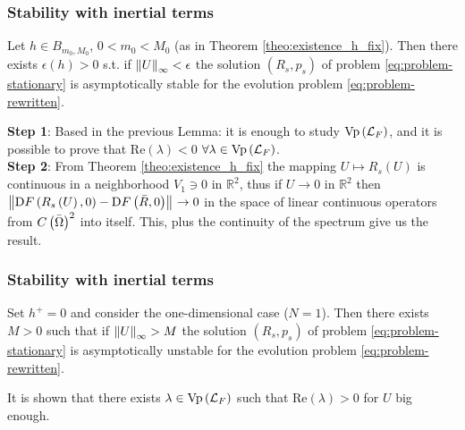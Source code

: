 \documentclass[10pt,aspectratio=169]{beamer}
\begin{document}

\begin{frame}
\frametitle{Stability with inertial terms}
\begin{theorem}\label{theo:stabilite-avec-inertie-h-fixe} Let $h\in B_{m_0,M_0}$, $0<m_0<M_0$ (as in Theorem \ref{theo:existence_h_fix}). Then there exists $\epsilon\left(h\right)>0$ s.t. if $\left\lVert U\right\rVert_{\infty}<\epsilon$ the solution $\left(R_s,p_s\right)$ of problem \eqref{eq:problem-stationary} is asymptotically stable for the evolution problem \eqref{eq:problem-rewritten}.
\end{theorem}\bigskip
\textbf{Step 1}: Based in the previous Lemma: it is enough to study $\textnormal{Vp}\left(\mathcal{L}_F\right)$, and it is possible to prove that  $\mbox{Re}\left(\lambda\right)<0$ $\forall \lambda \in \textnormal{Vp}\left(\mathcal{L}_F\right)$.\\ \bigskip
\textbf{Step 2}: From Theorem \ref{theo:existence_h_fix} the mapping $U\mapsto R_s\left(U\right)$ is continuous in a neighborhood $V_1\ni 0$ in $\mathbb{R}^2$, thus if $U\rightarrow 0$ in $\mathbb{R}^2$ then $\left\lVert\textnormal{D}F\left(R_s\left(U\right),0\right)-\textnormal{D}F\left(\bar{R},0\right)\right\rVert_{}\rightarrow 0$ in the space of linear continuous operators from $C\left(\bar{\Omega}\right)^2$ into itself. This, plus the continuity of the spectrum give us the result.
\end{frame}


\begin{frame}
\frametitle{Stability with inertial terms}
\begin{theorem}\label{theo:instabilite-avec-inertie-U-fixe} Set $h^+=0$ and consider the one-dimensional case ($N=1$). Then there exists $M>0$ such that if $\left\lVert U\right\rVert_{\infty}>M$ the solution $\left(R_s,p_s\right)$ of problem \eqref{eq:problem-stationary} is asymptotically unstable for the evolution problem \eqref{eq:problem-rewritten}.
\end{theorem}\bigskip
It is shown that there exists $\lambda\in \textnormal{Vp}\left(\mathcal{L}_F\right)$ such that $\mbox{Re}(\lambda)>0$ for $U$ big enough.
\end{frame}

\end{document}
